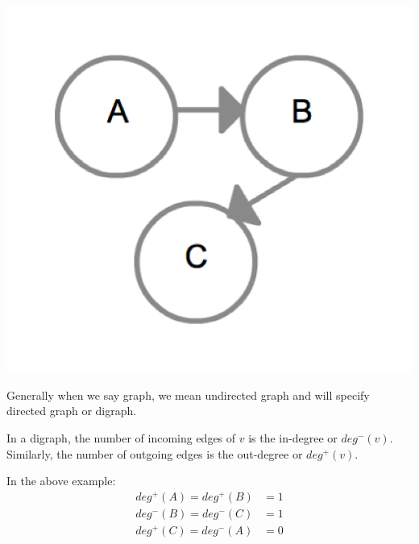 {
  \includegraphics[scale=0.2]{DiGraph}
  \label{fig:DiGraph}
}

Generally when we say graph, we mean undirected graph and will specify
directed graph or digraph.

In a digraph, the number of incoming edges of $v$ is the in-degree or
$deg^-(v)$.  Similarly, the number of outgoing edges is the
out-degree or $deg^+(v)$.

In the above example:
%
\begin{align*}
deg^+(A) = deg^+(B) &= 1 \\
deg^-(B) = deg^-(C) &= 1 \\
deg^+(C) = deg^-(A) &= 0
\end{align*}



